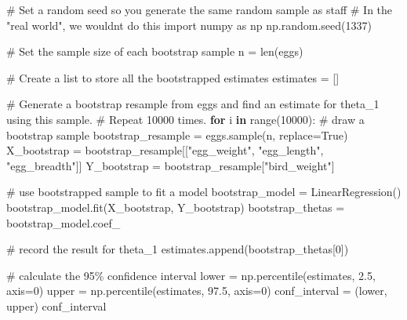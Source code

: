 \documentclass[
  letterpaper,
  DIV=11,
  numbers=noendperiod]{scrreprt}
\newenvironment{Shaded}{\begin{snugshade}}{\end{snugshade}}
\newcommand{\BuiltInTok}[1]{\textcolor[rgb]{0.00,0.23,0.31}{#1}}
\newcommand{\CommentTok}[1]{\textcolor[rgb]{0.37,0.37,0.37}{#1}}
\newcommand{\ControlFlowTok}[1]{\textcolor[rgb]{0.00,0.23,0.31}{\textbf{#1}}}
\newcommand{\DecValTok}[1]{\textcolor[rgb]{0.68,0.00,0.00}{#1}}
\newcommand{\FloatTok}[1]{\textcolor[rgb]{0.68,0.00,0.00}{#1}}
\newcommand{\ImportTok}[1]{\textcolor[rgb]{0.00,0.46,0.62}{#1}}
\newcommand{\KeywordTok}[1]{\textcolor[rgb]{0.00,0.23,0.31}{\textbf{#1}}}
\newcommand{\NormalTok}[1]{\textcolor[rgb]{0.00,0.23,0.31}{#1}}
\newcommand{\OperatorTok}[1]{\textcolor[rgb]{0.37,0.37,0.37}{#1}}
\newcommand{\StringTok}[1]{\textcolor[rgb]{0.13,0.47,0.30}{#1}}
\newcommand{\VariableTok}[1]{\textcolor[rgb]{0.07,0.07,0.07}{#1}}
\begin{document}
\begin{Shaded}
\begin{Highlighting}[]
\CommentTok{\# Set a random seed so you generate the same random sample as staff}
\CommentTok{\# In the "real world", we wouldn\textquotesingle{}t do this}
\ImportTok{import}\NormalTok{ numpy }\ImportTok{as}\NormalTok{ np}
\NormalTok{np.random.seed(}\DecValTok{1337}\NormalTok{)}

\CommentTok{\# Set the sample size of each bootstrap sample}
\NormalTok{n }\OperatorTok{=} \BuiltInTok{len}\NormalTok{(eggs)}

\CommentTok{\# Create a list to store all the bootstrapped estimates}
\NormalTok{estimates }\OperatorTok{=}\NormalTok{ []}

\CommentTok{\# Generate a bootstrap resample from \textasciigrave{}eggs\textasciigrave{} and find an estimate for theta\_1 using this sample. }
\CommentTok{\# Repeat 10000 times.}
\ControlFlowTok{for}\NormalTok{ i }\KeywordTok{in} \BuiltInTok{range}\NormalTok{(}\DecValTok{10000}\NormalTok{):}
    \CommentTok{\# draw a bootstrap sample}
\NormalTok{    bootstrap\_resample }\OperatorTok{=}\NormalTok{ eggs.sample(n, replace}\OperatorTok{=}\VariableTok{True}\NormalTok{)}
\NormalTok{    X\_bootstrap }\OperatorTok{=}\NormalTok{ bootstrap\_resample[[}\StringTok{"egg\_weight"}\NormalTok{, }\StringTok{"egg\_length"}\NormalTok{, }\StringTok{"egg\_breadth"}\NormalTok{]]}
\NormalTok{    Y\_bootstrap }\OperatorTok{=}\NormalTok{ bootstrap\_resample[}\StringTok{"bird\_weight"}\NormalTok{]}
    
    \CommentTok{\# use bootstrapped sample to fit a model}
\NormalTok{    bootstrap\_model }\OperatorTok{=}\NormalTok{ LinearRegression()}
\NormalTok{    bootstrap\_model.fit(X\_bootstrap, Y\_bootstrap)}
\NormalTok{    bootstrap\_thetas }\OperatorTok{=}\NormalTok{ bootstrap\_model.coef\_}
    
    \CommentTok{\# record the result for theta\_1}
\NormalTok{    estimates.append(bootstrap\_thetas[}\DecValTok{0}\NormalTok{])}
    
\CommentTok{\# calculate the 95\% confidence interval }
\NormalTok{lower }\OperatorTok{=}\NormalTok{ np.percentile(estimates, }\FloatTok{2.5}\NormalTok{, axis}\OperatorTok{=}\DecValTok{0}\NormalTok{)}
\NormalTok{upper }\OperatorTok{=}\NormalTok{ np.percentile(estimates, }\FloatTok{97.5}\NormalTok{, axis}\OperatorTok{=}\DecValTok{0}\NormalTok{)}
\NormalTok{conf\_interval }\OperatorTok{=}\NormalTok{ (lower, upper)}
\NormalTok{conf\_interval}
\end{Highlighting}
\end{Shaded}
\end{document}
